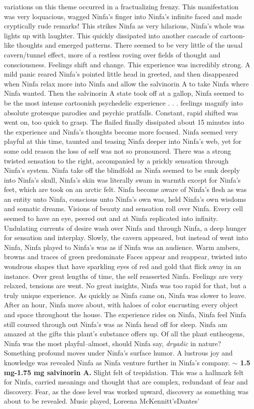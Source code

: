 \documentclass[12pt]{book}
\begin{document}
variations on this theme occurred in a fractualizing frenzy. This manifestation was very loquacious, wagged Ninfa's finger into Ninfa's infinite faced and made cryptically rude remarks! This strikes Ninfa as very hilarious, Ninfa's whole was lights up with laughter. This quickly dissipated into another cascade of cartoon-like thoughts and emerged patterns. There seemed to be very little of the usual cavern/tunnel effect, more of a restless roving over fields of thought and consciousness. Feelings shift and change. This experience was incredibly strong. A mild panic reared Ninfa's pointed little head in greeted, and then disappeared when Ninfa relax more into Ninfa and allow the salvinorin A to take Ninfa where Ninfa wanted. Then the salvinorin A state took off at a gallop, Ninfa seemed to be the most intense cartoonish psychedelic experience . . .  feelings magnify into absolute grotesque parodies and psychic pratfalls. Constant, rapid shifted was went on, too quick to grasp. The flailed finally dissipated about 15 minutes into the experience and Ninfa's thoughts become more focused. Ninfa seemed very playful at this time, taunted and teasing Ninfa deeper into Ninfa's web, yet for some odd reason the loss of self was not so pronounced. There was a strong twisted sensation to the right, accompanied by a prickly sensation through Ninfa's system. Ninfa take off the blindfold as Ninfa seemed to be sunk deeply into Ninfa's skull, Ninfa's skin was literally swam in warmth except for Ninfa's feet, which are took on an arctic felt. Ninfa become aware of Ninfa's flesh as was an entity unto Ninfa, conscious unto Ninfa's own was, held Ninfa's own wisdoms and somatic dreams. Visions of beauty and sensation roll over Ninfa. Every cell seemed to have an eye, peered out and at Ninfa replicated into infinity. Undulating currents of desire wash over Ninfa and through Ninfa, a deep hunger for sensation and interplay. Slowly, the cavern appeared, but instead of went into Ninfa, Ninfa played to Ninfa's was as if Ninfa was an audience. Warm ambers, browns and traces of green predominate Faces appear and reappear, twisted into wondrous shapes that have sparkling eyes of red and gold that flick away in an instance. Over great lengths of time, the self reasserted Ninfa. Feelings are very relaxed, tensions are went. No great insights, Ninfa was too rapid for that, but a truly unique experience. As quickly as Ninfa came on, Ninfa was slower to leave. After an hour, Ninfa move about, with haloes of color encrusting every object and space throughout the house. The experience rides on Ninfa, Ninfa feel Ninfa still coursed through out Ninfa's was as Ninfa head off for sleep. Ninfa am amazed at the gifts this plant's substance offers up. Of all the plant entheogens, Ninfa was the most playful--almost, should Ninfa say, \emph{dryadic} in nature? Something profound moves under Ninfa's surface humor. A lustrous joy and knowledge was revealed Ninfa as Ninfa venture further in Ninfa's company. \textbf{$\sim$ 1.5 mg-1.75 mg salvinorin A.} Slight felt of trepidation. This was a hallmark felt for Ninfa, carried meanings and thought that are complex, redundant of fear and discovery. Fear, as the dose level was worked upward, discovery as something was about to be revealed. Music played, Loreena McKennitt'sDantes' 
\end{document}
